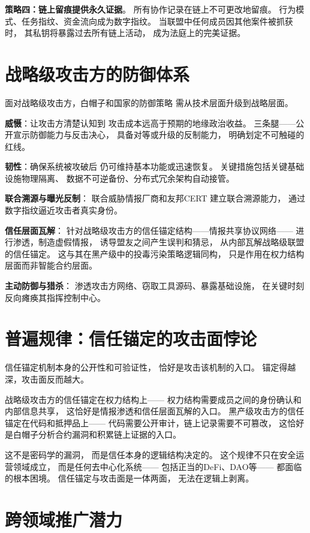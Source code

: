 \documentclass[11pt,a4paper]{article}
\begin{document}
\textbf{策略四：链上留痕提供永久证据}。
所有协作记录在链上不可更改地留痕。
行为模式、任务指纹、资金流向成为数字指纹。
当联盟中任何成员因其他案件被抓获时，
其私钥将暴露过去所有链上活动，
成为法庭上的完美证据。

\section{战略级攻击方的防御体系}

面对战略级攻击方，白帽子和国家的防御策略
需从技术层面升级到战略层面。

\textbf{威慑}：让攻击方清楚认知到
攻击成本远高于预期的地缘政治收益。
三条腿——公开宣示防御能力与反击决心，
具备对等或升级的反制能力，
明确划定不可触碰的红线。

\textbf{韧性}：确保系统被攻破后
仍可维持基本功能或迅速恢复。
关键措施包括关键基础设施物理隔离、
数据不可逆备份、分布式冗余架构自动接管。

\textbf{联合溯源与曝光反制}：
联合威胁情报厂商和友邦CERT
建立联合溯源能力，
通过数字指纹逼近攻击者真实身份。

\textbf{信任层面瓦解}：
针对战略级攻击方的信任锚定结构——情报共享协议网络——
进行渗透，制造虚假情报，
诱导盟友之间产生误判和猜忌，
从内部瓦解战略级联盟的信任锚定。
这与其在黑产级中的投毒污染策略逻辑同构，
只是作用在权力结构层面而非智能合约层面。

\textbf{主动防御与猎杀}：
渗透攻击方网络、窃取工具源码、暴露基础设施，
在关键时刻反向瘫痪其指挥控制中心。

\section{普遍规律：信任锚定的攻击面悖论}

信任锚定机制本身的公开性和可验证性，
恰好是攻击该机制的入口。
锚定得越深，攻击面反而越大。

战略级攻击方的信任锚定在权力结构上——
权力结构需要成员之间的身份确认和内部信息共享，
这恰好是情报渗透和信任层面瓦解的入口。
黑产级攻击方的信任锚定在代码和抵押品上——
代码需要公开审计，链上记录需要不可篡改，
这恰好是白帽子分析合约漏洞和积累链上证据的入口。

这不是密码学的漏洞，
而是信任本身的逻辑结构决定的。
这个规律不只在安全运营领域成立，
而是任何去中心化系统——
包括正当的DeFi、DAO等——
都面临的根本困境。
信任锚定与攻击面是一体两面，
无法在逻辑上剥离。

\section{跨领域推广潜力}
\end{document}
